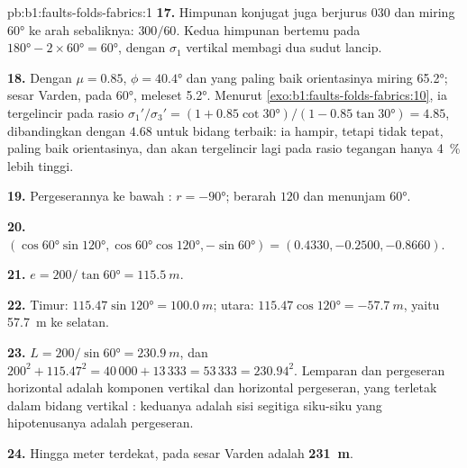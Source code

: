 \begin{solution}{pb:b1:faults-folds-fabrics:1}
\textbf{17.} Himpunan konjugat juga berjurus $030$ dan miring \ang{60} ke arah sebaliknya:
$300/60$. Kedua himpunan bertemu pada $\ang{180} - 2\times\ang{60} = \ang{60}$, dengan $\sigma_1$
vertikal membagi dua sudut lancip.

\textbf{18.} Dengan $\mu = 0.85$,
$\phi = \ang{40.4}$ dan  yang paling baik orientasinya
miring \ang{65.2}; sesar Varden, pada \ang{60}, meleset \ang{5.2}. Menurut
\cref{exo:b1:faults-folds-fabrics:10}, ia tergelincir pada rasio
$\sigma_1'/\sigma_3' = (1 + 0.85\cot\ang{30})/(1 - 0.85\tan\ang{30}) = 4.85$,
dibandingkan dengan $4.68$ untuk bidang terbaik: ia hampir, tetapi tidak tepat, paling baik
orientasinya, dan akan tergelincir lagi pada rasio tegangan hanya \qty{4}{\percent} lebih tinggi.

\textbf{19.} Pergeserannya ke bawah : $r = \ang{-90}$;  berarah $120$ dan
menunjam \ang{60}.

\textbf{20.} $(\cos\ang{60}\sin\ang{120}, \cos\ang{60}\cos\ang{120},
-\sin\ang{60}) = (0.4330, -0.2500, -0.8660)$.

\textbf{21.} $e = 200/\tan\ang{60} = \qty{115.5}{m}$.

\textbf{22.} Timur: $115.47\sin\ang{120} = \qty{100.0}{m}$; utara:
$115.47\cos\ang{120} = \qty{-57.7}{m}$, yaitu \qty{57.7}{m} ke selatan.

\textbf{23.} $L = 200/\sin\ang{60} = \qty{230.9}{m}$, dan
$200^2 + 115.47^2 = 40\,000 + 13\,333 = 53\,333 = 230.94^2$. Lemparan dan pergeseran horizontal
adalah komponen vertikal dan horizontal pergeseran, yang terletak dalam bidang vertikal :
keduanya adalah sisi segitiga siku-siku yang hipotenusanya adalah pergeseran.

\textbf{24.} Hingga meter terdekat,  pada sesar Varden adalah
\textbf{\qty[text-series-to-math=true]{231}{m}}.
\end{solution}
